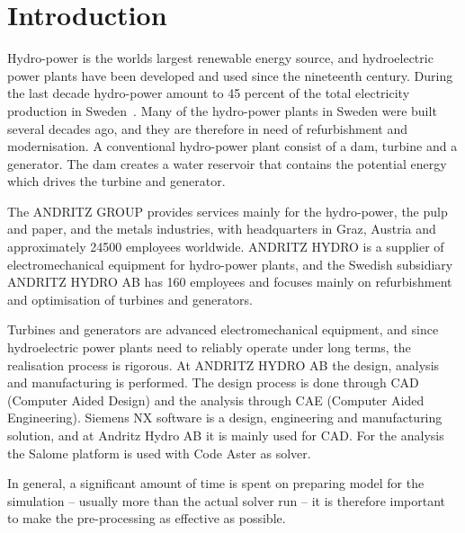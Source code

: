 
\section{Introduction}

Hydro-power is the worlds largest renewable energy source, and hydroelectric power plants have been developed and used since the nineteenth century. During the last decade hydro-power amount to 45 percent of the total electricity production in Sweden~\cite{scb}. Many of the hydro-power plants in Sweden were built several decades ago, and they are therefore in need of refurbishment and modernisation. A conventional hydro-power plant consist of a dam, turbine and a generator. The dam creates a water reservoir that contains the potential energy which drives the turbine and generator.

The ANDRITZ GROUP provides services mainly for the hydro-power, the pulp and paper, and the metals industries, with headquarters in Graz, Austria and approximately \num{24500} employees worldwide. ANDRITZ HYDRO is a supplier of electromechanical equipment for hydro-power plants, and the Swedish subsidiary ANDRITZ HYDRO AB has 160 employees and focuses mainly on refurbishment and optimisation of turbines and generators.

Turbines and generators are advanced electromechanical equipment, and since hydroelectric power plants need to reliably operate under long terms, the realisation process is rigorous. At ANDRITZ HYDRO AB the design, analysis and manufacturing is performed. The design process is done through CAD (Computer Aided Design) and the analysis through CAE (Computer Aided Engineering). Siemens NX software is a design, engineering and manufacturing solution, and at Andritz Hydro AB it is mainly used for CAD. For the analysis the Salome platform is used with Code Aster as solver.

In general, a significant amount of time is spent on preparing model for the simulation -- usually more than the actual solver run -- it is therefore important to make the pre-processing as effective as possible.

